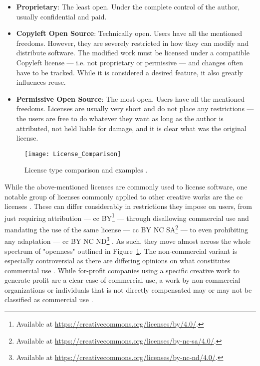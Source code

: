 \begin{itemize}
    \item \textbf{Proprietary}: The least open. Under the complete control of the author, usually confidential and paid.
    \item \textbf{Copyleft Open Source}: Technically open. Users have all the mentioned freedoms. However, they are severely restricted in how they can modify and distribute software. The modified work must be licensed under a compatible Copyleft license --- i.e. not proprietary or permissive --- and changes often have to be tracked. While it is considered a desired feature, it also greatly influences reuse.
    \item \textbf{Permissive Open Source}: The most open. Users have all the mentioned freedoms. Licenses are usually very short and do not place any restrictions --- the users are free to do whatever they want as long as the author is attributed, not held liable for damage, and it is clear what was the original license.
\end{itemize}

\begin{figure}[H]
    \centering
    \texttt{[image: License\_Comparison]}
    \caption{License type comparison and examples \parencite{Duras_2020}.}
    \label{fig:license-comparison}
\end{figure}

While the above-mentioned licenses are commonly used to license software, one notable group of licenses commonly applied to other creative works are the \gls{cc} licenses \parencite{Hagedorn_2011}.
These can differ considerably in restrictions they impose on users, from just requiring attribution --- \gls{cc} BY\footnote{Available at \url{https://creativecommons.org/licenses/by/4.0/}.} --- through disallowing commercial use and mandating the use of the same license --- \gls{cc} BY NC SA\footnote{Available at \url{https://creativecommons.org/licenses/by-nc-sa/4.0/}.} --- to even prohibiting any adaptation --- \gls{cc} BY NC ND\footnote{Available at \url{https://creativecommons.org/licenses/by-nc-nd/4.0/}.} \parencite{Hagedorn_2011}.
As such, they move almost across the whole spectrum of "openness" outlined in Figure~\ref{fig:license-comparison}.
The non-commercial variant is especially controversial as there are differing opinions on what constitutes commercial use \parencite{Hagedorn_2011}.
While for-profit companies using a specific creative work to generate profit are a clear case of commercial use, a work by non-commercial organizations or individuals that is not directly compensated may or may not be classified as commercial use \parencite{Hagedorn_2011}.

